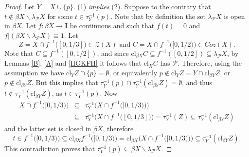 \documentclass{amsart}
\theoremstyle{definition}
\theoremstyle{remark}
\theoremstyle{notation}
\numberwithin{equation}{section}
\begin{document}
\begin{proof}
Let $Y=X\cup\{p\}$. (1) {\em  implies} (2).  Suppose to the contrary that $t\notin \beta X\backslash\lambda_{{\mathcal P}} X$
for some $t\in \tau_Y^{-1} (p)$. Note that by definition the set $\lambda_{{\mathcal P}} X$ is open in $\beta X$. Let $f:\beta X\rightarrow {\mathbf I}$ be continuous
and such that $f(t)=0$ and $f|( \beta X\backslash\lambda_{{\mathcal P}} X)\equiv 1$. Let
\[Z= X\cap f^{-1}\big([0,1/3]\big)\in {\mathscr Z}(X)\mbox{ and } C=X\cap f^{-1}\big([0,1/2)\big)\in Coz(X).\]
Note that $C\subseteq f^{-1}([0,1/2])$, and since $\mbox{cl}_{\beta X}C\subseteq f^{-1}([0,1/2])\subseteq\lambda_{{\mathcal P}} X$,
by Lemmas  \ref{B}, \ref{A} and \ref{HGKFH} it follows that $\mbox{cl}_XC$  has ${\mathcal P}$.
Therefore, using the assumption  we have $\mbox{cl}_Y Z\cap \{p\}=\emptyset$, or equivalently $p\notin \mbox{cl}_Y Z=Y\cap \mbox{cl}_{\beta Y} Z$, or $p\notin \mbox{cl}_{\beta Y} Z$. But this implies that $\tau_Y^{-1} (p)\cap\tau_Y^{-1} (\mbox{cl}_{\beta Y} Z)=\emptyset$, and thus $t\notin \tau_Y^{-1} (\mbox{cl}_{\beta Y} Z)$, as
$t\in \tau_Y^{-1} (p)$. Now
\begin{eqnarray*}
X\cap f^{-1}\big([0,1/3)\big)&\subseteq&\tau_Y^{-1} \big(X\cap f^{-1}\big([0,1/3)\big)\big)\\&\subseteq&\tau_Y^{-1}\big(X\cap f^{-1}\big([0,1/3]\big)\big)=\tau_Y^{-1} (Z)\subseteq\tau_Y^{-1}(\mbox{cl}_{\beta Y} Z)
\end{eqnarray*}
and the latter set is closed in $\beta X$, therefore
\[t\in f^{-1}\big([0,1/3)\big)\subseteq\mbox{cl}_{\beta X}f^{-1}\big([0,1/3)\big)=\mbox{cl}_{\beta X}\big(X\cap f^{-1}\big([0,1/3)\big)\big)\subseteq\tau_Y^{-1} (\mbox{cl}_{\beta Y} Z).\]
This contradiction proves that $\tau_Y^{-1} (p)\subseteq \beta X\backslash\lambda_{{\mathcal P}} X$.


\end{proof}
\end{document}

